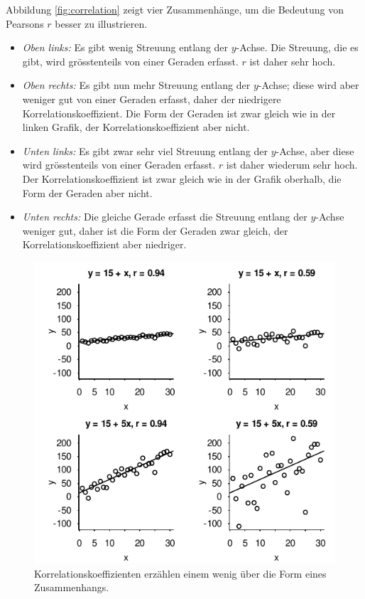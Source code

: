 \documentclass[oneside, 10pt]{book}\usepackage[]{graphicx}\usepackage[]{xcolor}
\newenvironment{knitrout}{}{} %
\begin{document}
Abbildung \ref{fig:correlation} zeigt vier Zusammenhänge,
um die Bedeutung von Pearsons $r$ besser zu illustrieren.
\begin{itemize}
\item \textit{Oben links:} Es gibt wenig Streuung entlang der $y$-Achse.
Die Streuung, die es gibt, wird grösstenteils von einer Geraden erfasst.
$r$ ist daher sehr hoch.
\item \textit{Oben rechts:} Es gibt nun mehr Streuung entlang der $y$-Achse;
diese wird aber weniger gut von einer Geraden erfasst, daher der niedrigere Korrelationskoeffizient.
Die Form der Geraden ist zwar gleich wie in der linken Grafik, der Korrelationskoeffizient aber nicht.
\item \textit{Unten links:} Es gibt zwar sehr viel Streuung entlang der $y$-Achse, aber diese wird grösstenteils von einer Geraden erfasst. $r$ ist daher wiederum sehr hoch. Der Korrelationskoeffizient ist zwar gleich wie in der Grafik oberhalb,
die Form der Geraden aber nicht.
\item \textit{Unten rechts:} Die gleiche Gerade erfasst die Streuung entlang der $y$-Achse weniger gut, daher ist die Form der Geraden zwar gleich, der Korrelationskoeffizient aber niedriger.
\end{itemize}

\begin{knitrout}
\color{fgcolor}\begin{figure}[tp]

{\centering \includegraphics[width=.5\textwidth]{figs/unnamed-chunk-182-1} 

}

\caption{Korrelationskoeffizienten erzählen einem wenig über die Form eines Zusammenhangs.\label{fig:correlation}}\label{fig:unnamed-chunk-182}
\end{figure}

\end{knitrout}
\end{document}
